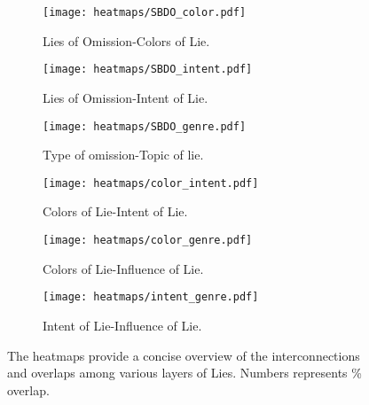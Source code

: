 \begin{figure*}[!h]
    \begin{subfigure}[b]{0.5\textwidth}
    \centering
        \texttt{[image: heatmaps/SBDO\_color.pdf]}
        \caption{Lies of Omission-Colors of Lie.}
    \end{subfigure}
    \begin{subfigure}[b]{0.5\textwidth}
    \centering
        \texttt{[image: heatmaps/SBDO\_intent.pdf]}
        \caption{Lies of Omission-Intent of Lie.}
    \end{subfigure}
    
    \begin{subfigure}[b]{0.5\textwidth}
    \centering
        \texttt{[image: heatmaps/SBDO\_genre.pdf]}
        \caption{Type of omission-Topic of lie.}
    \end{subfigure}            
    \begin{subfigure}[b]{0.5\textwidth}
    \centering
        \texttt{[image: heatmaps/color\_intent.pdf]}
        \caption{Colors of Lie-Intent of Lie.}
    \end{subfigure}
    
    \begin{subfigure}[b]{0.5\textwidth}
    \centering
        \texttt{[image: heatmaps/color\_genre.pdf]}

        \caption{Colors of Lie-Influence of Lie.}
    \end{subfigure}
    \begin{subfigure}[b]{0.5\textwidth}
    \centering
        \texttt{[image: heatmaps/intent\_genre.pdf]}
        \caption{Intent of Lie-Influence of Lie.}
    \end{subfigure}
    
    \caption{The heatmaps provide a concise overview of the interconnections and overlaps among various layers of Lies. Numbers represents \% overlap. }
    \label{fig:heatmap_layers}
\end{figure*}
